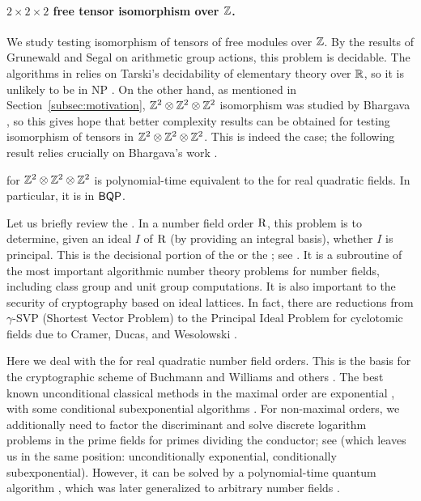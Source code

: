 \paragraph{$2\times 2\times 2$ free tensor isomorphism over $\mathbb{Z}$.} 
\newcommand{\disc}{\operatorname{disc}}
\newcommand{\Cl}{\operatorname{Cl}}
We study testing isomorphism of tensors of free modules over $\mathbb{Z}$. By the results of Grunewald and Segal on arithmetic group actions\cite{GS80-1}, this problem is decidable. The algorithms in \cite{GS80-1} relies on Tarski's decidability of elementary theory over $\mathbb{R}$, so it is unlikely to be in NP \cite{BKR84,Gri88}. On the other hand, as mentioned in Section~\ref{subsec:motivation}, $\mathbb{Z}^2 \otimes \mathbb{Z}^2 \otimes \mathbb{Z}^2$ isomorphism was studied by Bhargava \cite{Bhargava}, so this gives hope that better complexity results can be obtained for testing isomorphism of tensors in $\mathbb{Z}^2 \otimes \mathbb{Z}^2 \otimes \mathbb{Z}^2$. This is indeed the case; the following result relies crucially on Bhargava's work \cite{Bhargava}.
	
	\begin{theorem}
		\label{thm:tensorZ}
		 for $\mathbb{Z}^2 \otimes \mathbb{Z}^2 \otimes \mathbb{Z}^2$ is polynomial-time equivalent to the  for real quadratic fields. In particular, it is in $\mathsf{BQP}$.
	\end{theorem}

Let us briefly review the . In a number field order $\mathrm{R}$, this problem is to determine, given an ideal $I$ of $\mathrm{R}$ (by providing an integral basis), whether $I$ is principal.  This is the decisional portion of the  or the ; see \cite[Chapter 16]{JacobsonWilliams}.  It is a subroutine of the most important algorithmic number theory problems for number fields, including class group and unit group computations.  It is also important to the security of cryptography based on ideal lattices.  In fact, there are reductions from $\gamma$-SVP (Shortest Vector Problem) to the Principal Ideal Problem for cyclotomic fields due to Cramer, Ducas, and Wesolowski \cite{CramerDucasWesolowski}.

Here we deal with the  for real quadratic number field orders.  This is the basis for the cryptographic scheme of Buchmann and Williams and others \cite{BuchmannWilliams, crypto1, crypto2}.  The best known unconditional classical methods in the maximal order are exponential \cite[Chapter 16]{JacobsonWilliams}, with some conditional subexponential algorithms \cite[Theorem 13.24]{JacobsonWilliams}.  For non-maximal orders, we additionally need to factor the discriminant and solve discrete logarithm problems in the prime fields for primes dividing the conductor; see \cite{BiasseFiekerJacobson} (which leaves us in the same position: unconditionally exponential, conditionally subexponential).  However, it can be solved by a polynomial-time quantum algorithm \cite{Hallgren}, which was later generalized to arbitrary number fields \cite{BiasseSong}.


